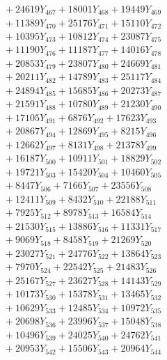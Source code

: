 \documentclass[a4paper,10pt]{article}
\begin{document}
{\begin{align}
&\;  + 24619 Y_{467} + 18001 Y_{468} + 19449 Y_{469} \\[0.3ex]
&\;  + 11389 Y_{470} + 25176 Y_{471} + 15110 Y_{472} \\[0.3ex]
&\;  + 10395 Y_{473} + 10812 Y_{474} + 23087 Y_{475} \\[0.3ex]
&\;  + 11190 Y_{476} + 11187 Y_{477} + 14016 Y_{478} \\[0.5ex]\allowbreak
&\;  + 20853 Y_{479} + 23807 Y_{480} + 24669 Y_{481} \\[0.3ex]
&\;  + 20211 Y_{482} + 14789 Y_{483} + 25117 Y_{484} \\[0.3ex]
&\;  + 24894 Y_{485} + 15685 Y_{486} + 20273 Y_{487} \\[0.3ex]
&\;  + 21591 Y_{488} + 10780 Y_{489} + 21230 Y_{490} \\[0.3ex]
&\;  + 17105 Y_{491} + 6876 Y_{492} + 17623 Y_{493} \\[0.3ex]
&\;  + 20867 Y_{494} + 12869 Y_{495} + 8215 Y_{496} \\[0.3ex]
&\;  + 12662 Y_{497} + 8131 Y_{498} + 21378 Y_{499} \\[0.3ex]
&\;  + 16187 Y_{500} + 10911 Y_{501} + 18829 Y_{502} \\[0.3ex]
&\;  + 19721 Y_{503} + 15420 Y_{504} + 10460 Y_{505} \\[0.3ex]
&\;  + 8447 Y_{506} + 7166 Y_{507} + 23556 Y_{508} \\[0.5ex]\allowbreak
&\;  + 12411 Y_{509} + 8432 Y_{510} + 22188 Y_{511} \\[0.3ex]
&\;  + 7925 Y_{512} + 8978 Y_{513} + 16584 Y_{514} \\[0.3ex]
&\;  + 21530 Y_{515} + 13886 Y_{516} + 11331 Y_{517} \\[0.3ex]
&\;  + 9069 Y_{518} + 8458 Y_{519} + 21269 Y_{520} \\[0.3ex]
&\;  + 23027 Y_{521} + 24776 Y_{522} + 13864 Y_{523} \\[0.3ex]
&\;  + 7970 Y_{524} + 22542 Y_{525} + 21483 Y_{526} \\[0.3ex]
&\;  + 25167 Y_{527} + 23627 Y_{528} + 14143 Y_{529} \\[0.3ex]
&\;  + 10173 Y_{530} + 15378 Y_{531} + 13465 Y_{532} \\[0.3ex]
&\;  + 10629 Y_{533} + 12485 Y_{534} + 10972 Y_{535} \\[0.3ex]
&\;  + 20698 Y_{536} + 23996 Y_{537} + 15048 Y_{538} \\[0.5ex]\allowbreak
&\;  + 10496 Y_{539} + 24025 Y_{540} + 24762 Y_{541} \\[0.3ex]
&\;  + 20953 Y_{542} + 15506 Y_{543} + 20964 Y_{544} \\[0.3ex]

\end{align}}
\end{document}

